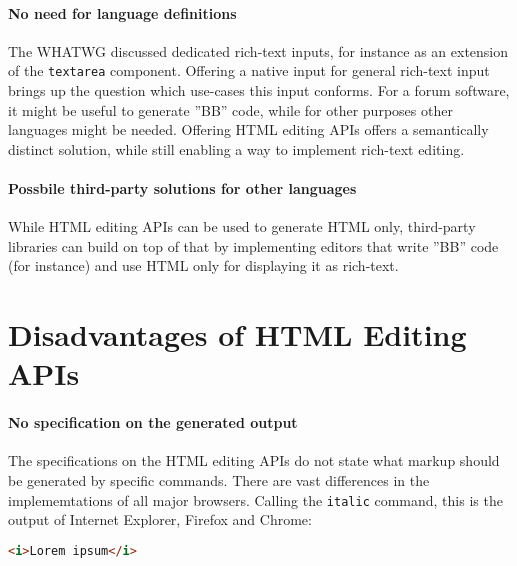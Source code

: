 \paragraph{No need for language definitions}

The WHATWG discussed dedicated rich-text inputs, for instance as an extension of the \texttt{textarea} component. Offering a native input for general rich-text input brings up the question which use-cases this input conforms. For a forum software, it might be useful to generate ''BB'' code, while for other purposes other languages might be needed. Offering HTML editing APIs offers a semantically distinct solution, while still enabling a way to implement rich-text editing. %

\paragraph{Possbile third-party solutions for other languages}

While HTML editing APIs can be used to generate HTML only, third-party libraries can build on top of that by implementing editors that write ''BB'' code (for instance) and use HTML only for displaying it as rich-text.

\section{Disadvantages of HTML Editing APIs}


\paragraph{No specification on the generated output}

The specifications on the HTML editing APIs do not state what markup should be generated by specific commands. There are vast differences in the implememtations of all major browsers. Calling the \texttt{italic} command, this is the output of Internet Explorer, Firefox and Chrome:

\begin{lstlisting}[language=html, caption=Markup of italic command in Internet Explorer, label=lst:italic-ie]
<i>Lorem ipsum</i>
\end{lstlisting}


